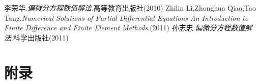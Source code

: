 \documentclass[a4paper,UTF8]{ctexart}
\theoremstyle{plain} \newtheorem{theorem}{定理}[section]
\theoremstyle{plain} \newtheorem{definition}{定义}[section]
\theoremstyle{plain} \newtheorem{lemma}{引理}[section]
\theoremstyle{plain} \newtheorem{proposition}{命题}[section]
\theoremstyle{plain} \newtheorem{example}{例}[section]
\theoremstyle{plain} \newtheorem{remark}{注}[section]
\theoremstyle{plain} \newtheorem{corollary}{推论}[section]
\begin{document}
\begin{thebibliography}{4}
   李荣华.\emph{偏微分方程数值解法}.高等教育出版社(2010) 
   Zhilin Li,Zhonghua Qiao,Tao Tang.\emph{Numerical Solutions of Partial Differential Equations-An Introduction to Finite Difference and Finite Element Methods}.(2011)
   孙志忠.\emph{偏微分方程数值解法}.科学出版社(2011)

\end{thebibliography}

\newpage

\section*{附录}
\end{document}
